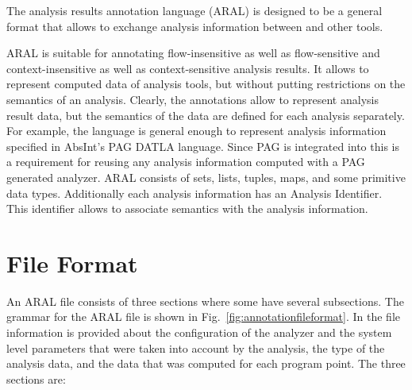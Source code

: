 The analysis results annotation language (ARAL) is designed to be a
general format that allows to exchange analysis information between
\satire{} and other tools. 


ARAL is suitable for annotating flow-insensitive as well as
flow-sensitive and context-insensitive as well as context-sensitive
analysis results. It allows to represent computed data of analysis
tools, but without putting restrictions on the semantics of an
analysis. Clearly, the annotations allow to represent analysis result
data, but the semantics of the data are defined for each analysis
separately. For example, the language is general enough to represent
analysis information specified in AbsInt's PAG DATLA language. Since
PAG is integrated into \satire{} this is a requirement for reusing any
analysis information computed with a PAG generated analyzer. ARAL
consists of sets, lists, tuples, maps, and some primitive data
types. Additionally each analysis information has an Analysis
Identifier. This identifier allows to associate semantics with the
analysis information.



\chapter{File Format}

An ARAL file consists of three sections where some have several subsections. The grammar for the ARAL file
is shown in Fig.~\ref{fig:annotationfileformat}. In the file
information is provided about the configuration of the analyzer and
the system level parameters that were taken into account by the
analysis, the type of the analysis data, and the data that was
computed for each program point. The three sections are:

